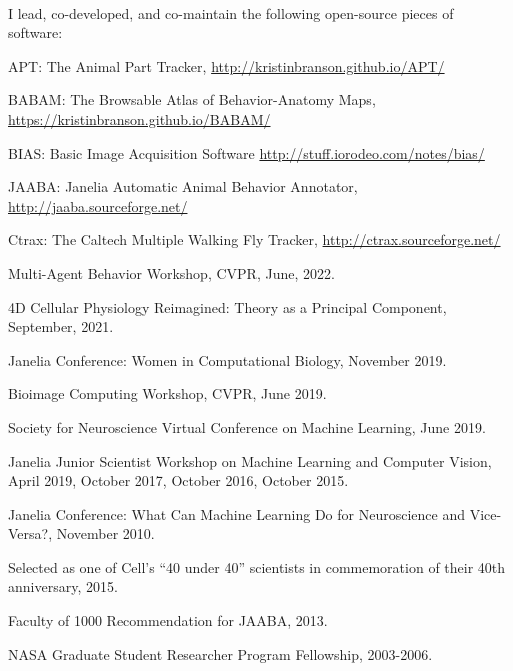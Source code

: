 \documentclass[11pt, letterpaper]{awesome-cv}
\begin{document}
\vspace{\acvSectionContentTopSkip}\\
I lead, co-developed, and co-maintain the following open-source pieces of software:\\
\begin{cvitems}
\item APT: The Animal Part Tracker, \url{http://kristinbranson.github.io/APT/}
  \item BABAM: The Browsable Atlas of Behavior-Anatomy Maps, \url{https://kristinbranson.github.io/BABAM/}
\item BIAS: Basic Image Acquisition Software \url{http://stuff.iorodeo.com/notes/bias/}
\item JAABA: Janelia Automatic Animal Behavior Annotator, \url{http://jaaba.sourceforge.net/}
\item Ctrax: The Caltech Multiple Walking Fly Tracker, \url{http://ctrax.sourceforge.net/}
\end{cvitems}
\vspace{\acvSectionContentTopSkip}

\vspace{\acvSectionContentTopSkip}
\vspace{2mm}
\begin{cvitems}
\item Multi-Agent Behavior Workshop, CVPR, June, 2022. 
\item 4D Cellular Physiology Reimagined: Theory as a Principal Component, September, 2021. 
\item Janelia Conference: Women in Computational Biology, November 2019.
\item Bioimage Computing Workshop, CVPR, June 2019.
\item Society for Neuroscience Virtual Conference on Machine Learning, June 2019.
\item Janelia Junior Scientist Workshop on Machine Learning and Computer Vision, April 2019, October 2017, October 2016, October 2015.
\item Janelia Conference: What Can Machine Learning Do for Neuroscience and Vice-Versa?, November 2010.
\end{cvitems}
\vspace{\acvSectionContentTopSkip}

\vspace{\acvSectionContentTopSkip}
\vspace{2mm}
\begin{cvitems}
\item Selected as one of Cell’s ``40 under 40'' scientists in commemoration of their 40th anniversary, 2015.
\item Faculty of 1000 Recommendation for JAABA, 2013.
\item NASA Graduate Student Researcher Program Fellowship, 2003-2006.
\end{cvitems}
\vspace{\acvSectionContentTopSkip}
\end{document}
